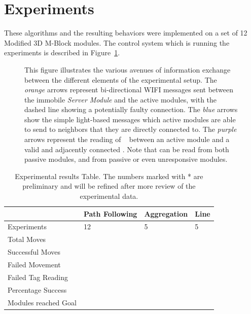 \section{Experiments}
\label{sec:Experiments}

These algorithms and the resulting behaviors were implemented on a set of 12 Modified 3D M-Block modules. The control system which is running the experiments is described in Figure~\ref{fig:electroncsChart}.

\begin{figure}[ht]

	
	
\caption{This figure illustrates the various avenues of information exchange between the different elements of the experimental setup. The \emph{orange} arrows represent bi-directional WIFI messages sent between the immobile \emph{Server Module} and the active modules, with the dashed line showing a potentially faulty connection. The \emph{blue} arrows show the simple light-based messages which active modules are able to send to neighbors that they are directly connected to. The \emph{purple} arrows represent the reading of \tagNamePlural~ between an active module and a valid and adjacently connected \tagName. Note that \tagNamePlural can be read from both passive modules, and from passive or even unresponsive modules.}
	
	\label{fig:electroncsChart}
\end{figure}

\begin{table}[h]
	\caption{Experimental results Table. The numbers marked with * are preliminary and will be refined after more review of the experimental data.}
	
	\begin{tabular}{ p{2.2cm}  p{1.8cm}  p{1.4cm} p{1.3cm} }
		\hline
							& Path Following& Aggregation 	& Line		\\
		\hline
		Experiments			&  12 			& 5				& 5 		\\
		Total Moves 		& 				&  				&	  		\\ 		
		Successful Moves	&				& 				& 			\\
		Failed Movement		&				&				&			\\
		Failed Tag Reading	&				&				&			\\
		Percentage Success	& 				& 				& 			\\
		Modules reached Goal&				&				&			\\
		
		
		
		
		
	\end{tabular}
	
	\label{tab:info}
\end{table}

